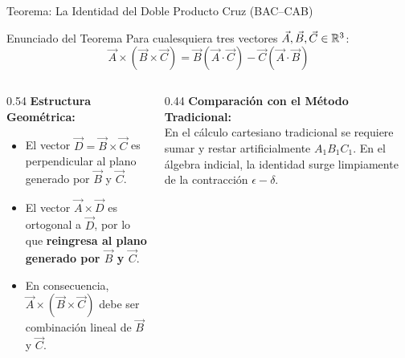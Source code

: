 \documentclass[10pt,aspectratio=169]{beamer}
\begin{document}
\begin{frame}{Teorema: La Identidad del Doble Producto Cruz (BAC--CAB)}
  \begin{block}{Enunciado del Teorema}
    \footnotesize
    Para cualesquiera tres vectores $\vec{A}, \vec{B}, \vec{C} \in \mathbb{R}^3$:
    \[
    \boxed{\vec{A} \times (\vec{B} \times \vec{C}) = \vec{B}(\vec{A}\cdot\vec{C}) - \vec{C}(\vec{A}\cdot\vec{B})}
    \]
  \end{block}
  \vspace{0.1cm}
  \begin{columns}[c]
    \begin{column}{0.54\textwidth}
      \footnotesize
      \textbf{Estructura Geométrica:}
      \begin{itemize}
        \itemsep2pt
        \item El vector $\vec{D} = \vec{B}\times\vec{C}$ es perpendicular al plano generado por $\vec{B}$ y $\vec{C}$.
        \item El vector $\vec{A}\times\vec{D}$ es ortogonal a $\vec{D}$, por lo que \textbf{reingresa al plano generado por $\vec{B}$ y $\vec{C}$}.
        \item En consecuencia, $\vec{A}\times(\vec{B}\times\vec{C})$ debe ser combinación lineal de $\vec{B}$ y $\vec{C}$.
      \end{itemize}
    \end{column}
    \begin{column}{0.44\textwidth}
      \footnotesize
      \textbf{Comparación con el Método Tradicional:}\\
      En el cálculo cartesiano tradicional se requiere sumar y restar artificialmente $A_1 B_1 C_1$. En el álgebra indicial, la identidad surge limpiamente de la contracción $\epsilon-\delta$.
    \end{column}
  \end{columns}
\end{frame}
\end{document}

